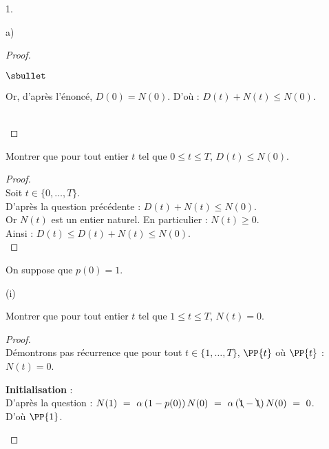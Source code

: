 \documentclass[11pt]{article}%
\begin{document}
\begin{noliste}{1.}
\begin{noliste}{a)}
\begin{proof}
\begin{remarkL}{.99}
\begin{noliste}{$\sbullet$}
	  \item Or, d'après l'énoncé, $D(0)=N(0)$. D'où : $D(t)
	  + N(t) \leq N(0)$.
        \end{noliste}
      \end{remarkL}~\\[-1.4cm]
    \end{proof}

    
    \item Montrer que pour tout entier $t$ tel que $0 \leq t \leq T$, 
    $D(t) \leq N(0)$.
    
    \begin{proof}~\\
      Soit $t \in \{0, \ldots, T\}$.\\
      D'après la question précédente : $D(t) + N(t) \leq N(0)$.\\
      Or $N(t)$ est un entier naturel. En particulier : $N(t) \geq 0$.\\
      Ainsi : $D(t) \leq D(t) + N(t) \leq N(0)$.
      ~\\[-1cm]
    \end{proof}

    
    \item On suppose que $p(0)=1$.
    \begin{nonoliste}{(i)}
      \item Montrer que pour tout entier $t$ tel que $1 \leq t \leq T$, 
      $N(t)=0$.
      
      \begin{proof}~\\
        Démontrons pas récurrence que pour tout $t \in \{1, \ldots, 
	T\}$, $\PP{t}$ \quad où \quad $\PP{t}$ : $N(t)=0$.
        \begin{noliste}{\fitem}
	  \item {\bf Initialisation} :\\
	  D'après la question  : $N(1) \ = \ \alpha \, 
	  (1-p(0)) \, N(0) \ = \ \alpha \, (\bcancel{1} - \bcancel{1})
	  \, N(0) \ = \ 0$.\\
	  D'où $\PP{1}$.
	  
	  
	  \newpage
	  

\end{noliste}
\end{proof}
\end{nonoliste}
\end{noliste}
\end{noliste}
\end{document}
